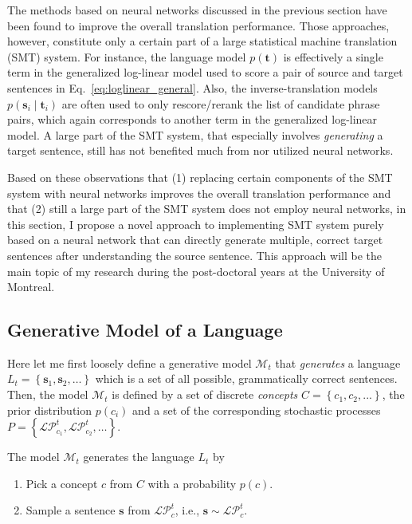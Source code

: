 \documentclass[11pt, oneside]{essay}
\newcommand{\vect}[1]{\mathbf{#1}}
\newcommand{\vs}[0]{\vect{s}}
\newcommand{\vt}[0]{\vect{t}}
\begin{document}
The methods based on neural networks discussed in the previous
section have been found to improve the overall translation
performance. Those approaches, however, constitute only a certain
part of a large statistical machine translation (SMT) system. For
instance, the language model $p(\vt)$ is effectively a single
term in the generalized log-linear model used to score a pair of
source and target sentences in Eq.~\eqref{eq:loglinear_general}.
Also, the inverse-translation models $p(\vs_i \mid \vt_i)$ are
often used to only rescore/rerank the list of candidate phrase
pairs, which again corresponds to another term in the generalized
log-linear model.  A large part of the SMT system, that
especially involves
\textit{generating} a target sentence, still has not benefited
much from nor utilized neural networks. 

Based on these observations that (1) replacing certain components
of the SMT system with neural networks improves the overall
translation performance and that (2) still a large part of the
SMT system does not employ neural networks, in this section, I
propose a novel approach to implementing SMT system purely based
on a neural network that can directly generate multiple, correct
target sentences after understanding the source sentence. This
approach will be the main topic of my research during the
post-doctoral years at the University of Montreal.

\subsection{Generative Model of a Language}
\label{sec:genlm}

Here let me first loosely define a generative model
$\mathcal{M}_t$ that \textit{generates} a language $L_t=\left\{
\vs_1, \vs_2, \dots \right\}$ which is a set of all possible,
grammatically correct sentences. Then, the model $\mathcal{M}_t$
is defined by a set of
discrete \textit{concepts} $C = \left\{ c_1, c_2, ... \right\}$,
the prior distribution $p(c_i)$ and 
a set of the corresponding stochastic processes $P=\left\{
\mathcal{LP}^t_{c_1}, \mathcal{LP}^t_{c_2}, \dots \right\}$.

The model $\mathcal{M}_t$ generates the language $L_t$ by
\begin{enumerate}
\item Pick a concept $c$ from $C$ with a probability $p(c)$.
\item Sample a sentence $\vs$ from $\mathcal{LP}^t_c$, i.e., $\vs \sim
\mathcal{LP}^t_c$.
\end{enumerate}
\end{document}
